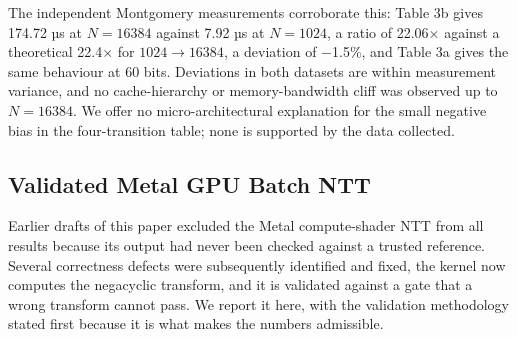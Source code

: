 The independent Montgomery measurements corroborate this: Table 3b gives 174.72 µs at \(N = 16384\) against 7.92 µs at \(N = 1024\), a ratio of 22.06× against a theoretical 22.4× for \(1024 \rightarrow 16384\), a deviation of −1.5\%, and Table 3a gives the same behaviour at 60 bits. Deviations in both datasets are within measurement variance, and no cache-hierarchy or memory-bandwidth cliff was observed up to \(N = 16384\). We offer no micro-architectural explanation for the small negative bias in the four-transition table; none is supported by the data collected.

\subsection{Validated Metal GPU Batch NTT}\label{validated-metal-gpu-batch-ntt}

Earlier drafts of this paper excluded the Metal compute-shader NTT from all results because its output had never been checked against a trusted reference. Several correctness defects were subsequently identified and fixed, the kernel now computes the negacyclic transform, and it is validated against a gate that a wrong transform cannot pass. We report it here, with the validation methodology stated first because it is what makes the numbers admissible.

